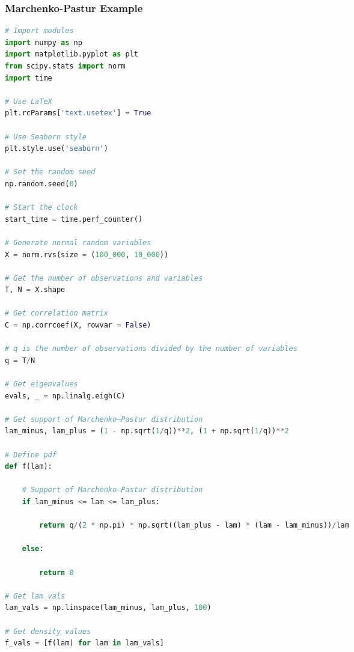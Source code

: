 \documentclass{beamer}
\begin{document}
\begin{frame}[fragile]
\frametitle{Marchenko-Pastur Example}

\begin{multicols}{2}
\begin{lstlisting}[language=Python]
# Import modules
import numpy as np
import matplotlib.pyplot as plt
from scipy.stats import norm
import time

# Use LaTeX
plt.rcParams['text.usetex'] = True

# Use Seaborn style
plt.style.use('seaborn')

# Set the random seed
np.random.seed(0)

# Start the clock
start_time = time.perf_counter()

# Generate normal random variables
X = norm.rvs(size = (100_000, 10_000))

# Get the number of observations and variables
T, N = X.shape

# Get correlation matrix
C = np.corrcoef(X, rowvar = False)

# q is the number of observations divided by the number of variables
q = T/N

# Get eigenvalues
evals, _ = np.linalg.eigh(C)

# Get support of Marchenko–Pastur distribution
lam_minus, lam_plus = (1 - np.sqrt(1/q))**2, (1 + np.sqrt(1/q))**2 
        
# Define pdf
def f(lam):
    
    # Support of Marchenko–Pastur distribution
    if lam_minus <= lam <= lam_plus:
    
        return q/(2 * np.pi) * np.sqrt((lam_plus - lam) * (lam - lam_minus))/lam
                
    else:
        
        return 0

# Get lam_vals
lam_vals = np.linspace(lam_minus, lam_plus, 100)

# Get density values
f_vals = [f(lam) for lam in lam_vals]
\end{lstlisting}
\end{multicols}

\end{frame}
\end{document}
